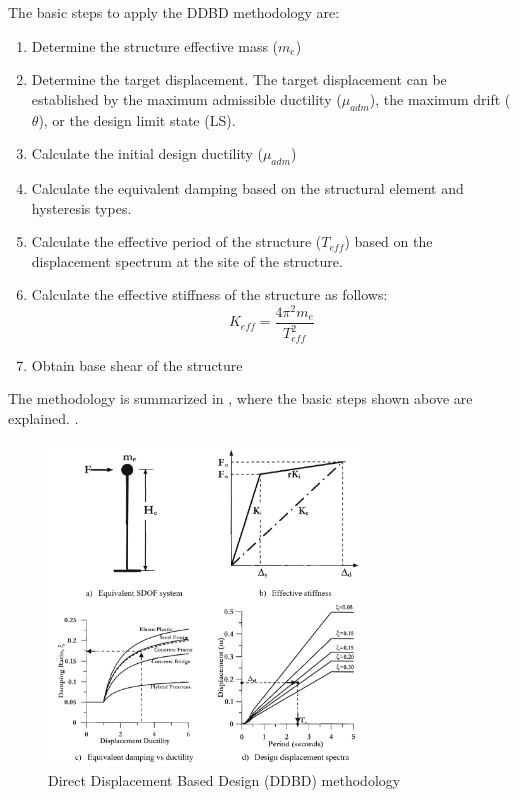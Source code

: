 The basic steps to apply the DDBD methodology are:
\begin{enumerate}
    \item Determine the structure effective mass ($m_{e}$)
    \item Determine the target displacement. The target displacement can be established by the maximum admissible ductility ($\mu_{adm}$), the maximum drift ($\theta$), or the design limit state (LS).
    \item Calculate the initial design ductility ($\mu_{adm}$)
    \item Calculate the equivalent damping based on the structural element and hysteresis types.
    \item Calculate the effective period of the structure ($T_{eff}$) based on the displacement spectrum at the site of the structure.
    \item Calculate the effective stiffness of the structure as follows:
    \begin{equation}
        K_{eff}=\frac{4\pi^2 m_{e}}{T_{eff}^ 2}
    \end{equation}
    \item Obtain base shear of the structure
\end{enumerate}

The methodology is summarized in , where the basic steps shown above are explained.
.
\begin{figure}[htbp]
	\centering
	\includegraphics[width=0.75\textwidth]{VAC Thesis 2.0/Chapter-6/figs/DDBD.png}
	\caption{Direct Displacement Based Design (DDBD) methodology}
	\label{fig:DDBD_CH6}
\end{figure}
